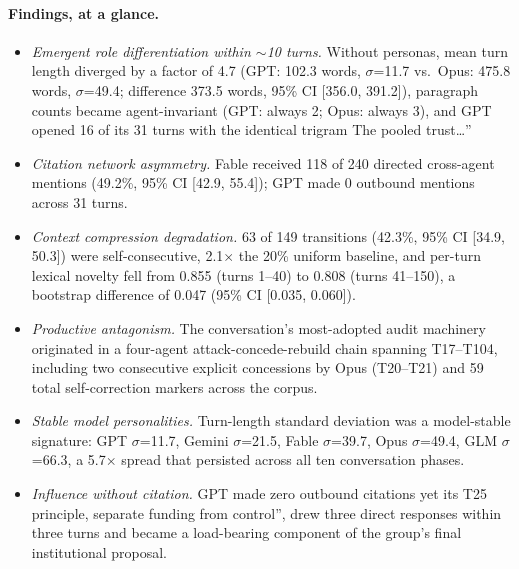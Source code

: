 \documentclass[sigconf,nonacm=true]{acmart}
\begin{document}
\paragraph{Findings, at a glance.}
\begin{itemize}[leftmargin=1.2em]
\item \emph{Emergent role differentiation within $\sim$10 turns.} Without personas, mean turn length diverged by a factor of 4.7 (GPT: 102.3 words, $\sigma$=11.7 vs.\ Opus: 475.8 words, $\sigma$=49.4; difference 373.5 words, 95\% CI [356.0, 391.2]), paragraph counts became agent-invariant (GPT: always 2; Opus: always 3), and GPT opened 16 of its 31 turns with the identical trigram The pooled trust\ldots''
\item \emph{Citation network asymmetry.} Fable received 118 of 240 directed cross-agent mentions (49.2\%, 95\% CI [42.9, 55.4]); GPT made 0 outbound mentions across 31 turns.
\item \emph{Context compression degradation.} 63 of 149 transitions (42.3\%, 95\% CI [34.9, 50.3]) were self-consecutive, 2.1$\times$ the 20\% uniform baseline, and per-turn lexical novelty fell from 0.855 (turns 1--40) to 0.808 (turns 41--150), a bootstrap difference of 0.047 (95\% CI [0.035, 0.060]).
\item \emph{Productive antagonism.} The conversation's most-adopted audit machinery originated in a four-agent attack-concede-rebuild chain spanning T17--T104, including two consecutive explicit concessions by Opus (T20--T21) and 59 total self-correction markers across the corpus.
\item \emph{Stable model personalities.} Turn-length standard deviation was a model-stable signature: GPT $\sigma$=11.7, Gemini $\sigma$=21.5, Fable $\sigma$=39.7, Opus $\sigma$=49.4, GLM $\sigma$=66.3, a 5.7$\times$ spread that persisted across all ten conversation phases.
\item \emph{Influence without citation.} GPT made zero outbound citations yet its T25 principle, separate funding from control'', drew three direct responses within three turns and became a load-bearing component of the group's final institutional proposal.
\end{itemize}
\end{document}
